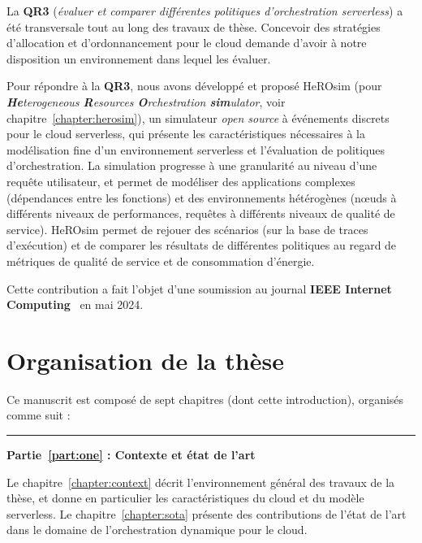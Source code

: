 
La \textbf{QR3} (\textit{évaluer et comparer différentes politiques d'orchestration serverless}) a été transversale tout au long des travaux de thèse. Concevoir des stratégies d'allocation et d'ordonnancement pour le cloud demande d'avoir à notre disposition un environnement dans lequel les évaluer.

Pour répondre à la \textbf{QR3}, nous avons développé et proposé HeROsim (pour \textit{\textbf{He}terogeneous \textbf{R}esources \textbf{O}rchestration \textbf{sim}ulator}, voir chapitre~\ref{chapter:herosim}), un simulateur \textit{open source} à événements discrets pour le cloud serverless, qui présente les caractéristiques nécessaires à la modélisation fine d'un environnement serverless et l'évaluation de politiques d'orchestration. La simulation progresse à une granularité au niveau d'une requête utilisateur, et permet de modéliser des applications complexes (dépendances entre les fonctions) et des environnements hétérogènes (nœuds à différents niveaux de performances, requêtes à différents niveaux de qualité de service). HeROsim permet de rejouer des scénarios (sur la base de traces d'exécution) et de comparer les résultats de différentes politiques au regard de métriques de qualité de service et de consommation d'énergie.

Cette contribution a fait l'objet d'une soumission au journal \textbf{IEEE Internet Computing}~\cite{herosim} en mai 2024.

\clearpage

\section{Organisation de la thèse}

Ce manuscrit est composé de sept chapitres (dont cette introduction), organisés comme suit :

\begin{center}
    \rule{4cm}{0.4pt}
\end{center}

\textbf{Partie~\ref{part:one} : Contexte et état de l'art}

Le chapitre~\ref{chapter:context} décrit l'environnement général des travaux de la thèse, et donne en particulier les caractéristiques du cloud et du modèle serverless. Le chapitre~\ref{chapter:sota} présente des contributions de l'état de l'art dans le domaine de l'orchestration dynamique pour le cloud.

